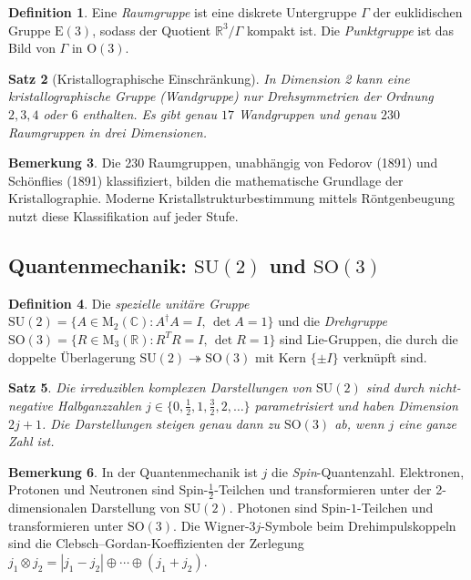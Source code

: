 \documentclass[12pt,a4paper]{amsart}
\newtheorem{theorem}{Satz}[section]
\theoremstyle{definition}
\newtheorem{definition}[theorem]{Definition}
\newtheorem{remark}[theorem]{Bemerkung}
\begin{document}
\begin{definition}
Eine \emph{Raumgruppe} ist eine diskrete Untergruppe $\Gamma$ der euklidischen Gruppe
$\mathrm{E}(3)$, sodass der Quotient $\mathbb{R}^3/\Gamma$ kompakt ist. Die
\emph{Punktgruppe} ist das Bild von $\Gamma$ in $\mathrm{O}(3)$.
\end{definition}

\begin{theorem}[Kristallographische Einschränkung]
In Dimension 2 kann eine kristallographische Gruppe (Wandgruppe) nur Drehsymmetrien der
Ordnung $2, 3, 4$ oder $6$ enthalten. Es gibt genau $17$ Wandgruppen und genau
$230$ Raumgruppen in drei Dimensionen.
\end{theorem}

\begin{remark}
Die 230 Raumgruppen, unabhängig von Fedorov (1891) und Schönflies (1891) klassifiziert,
bilden die mathematische Grundlage der Kristallographie. Moderne Kristallstrukturbestimmung
mittels Röntgenbeugung nutzt diese Klassifikation auf jeder Stufe.
\end{remark}

\subsection{Quantenmechanik: \texorpdfstring{$\mathrm{SU}(2)$}{SU(2)} und
            \texorpdfstring{$\mathrm{SO}(3)$}{SO(3)}}

\begin{definition}
Die \emph{spezielle unitäre Gruppe}
$\mathrm{SU}(2) = \{A \in \mathrm{M}_{2}(\mathbb{C}) : A^\dagger A = I,\, \det A = 1\}$
und die \emph{Drehgruppe}
$\mathrm{SO}(3) = \{R \in \mathrm{M}_3(\mathbb{R}) : R^T R = I,\, \det R = 1\}$
sind Lie-Gruppen, die durch die doppelte Überlagerung $\mathrm{SU}(2) \twoheadrightarrow
\mathrm{SO}(3)$ mit Kern $\{\pm I\}$ verknüpft sind.
\end{definition}

\begin{theorem}
Die irreduziblen komplexen Darstellungen von $\mathrm{SU}(2)$ sind durch nicht-negative
Halbganzzahlen $j \in \{0, \frac{1}{2}, 1, \frac{3}{2}, 2, \ldots\}$ parametrisiert
und haben Dimension $2j+1$. Die Darstellungen steigen genau dann zu $\mathrm{SO}(3)$
ab, wenn $j$ eine ganze Zahl ist.
\end{theorem}

\begin{remark}
In der Quantenmechanik ist $j$ die \emph{Spin}-Quantenzahl. Elektronen, Protonen und
Neutronen sind Spin-$\frac{1}{2}$-Teilchen und transformieren unter der 2-dimensionalen
Darstellung von $\mathrm{SU}(2)$. Photonen sind Spin-$1$-Teilchen und transformieren
unter $\mathrm{SO}(3)$. Die Wigner-$3j$-Symbole beim Drehimpulskoppeln sind die
Clebsch--Gordan-Koeffizienten der Zerlegung
$j_1 \otimes j_2 = |j_1 - j_2| \oplus \cdots \oplus (j_1 + j_2)$.
\end{remark}
\end{document}
